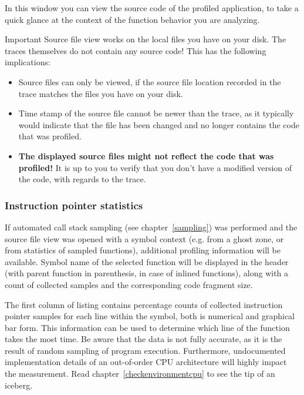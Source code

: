 \documentclass[hidelinks,titlepage,a4paper]{article}
\begin{document}
In this window you can view the source code of the profiled application, to take a quick glance at the context of the function behavior you are analyzing.

\begin{bclogo}[
noborder=true,
couleur=black!5,
logo=\bcbombe
]{Important}
Source file view works on the local files you have on your disk. The traces themselves do not contain any source code! This has the following implications:

\begin{itemize}
\item Source files can only be viewed, if the source file location recorded in the trace matches the files you have on your disk.
\item Time stamp of the source file cannot be newer than the trace, as it typically would indicate that the file has been changed and no longer contains the code that was profiled.
\item \textbf{The displayed source files might not reflect the code that was profiled!} It is up to you to verify that you don't have a modified version of the code, with regards to the trace.
\end{itemize}
\end{bclogo}

\subsubsection{Instruction pointer statistics}

If automated call stack sampling (see chapter~\ref{sampling}) was performed and the source file view was opened with a symbol context (e.g. from a ghost zone, or from statistics of sampled functions), additional profiling information will be available. Symbol name of the selected function will be displayed in the header (with parent function in parenthesis, in case of inlined functions), along with a count of collected samples and the corresponding code fragment size.

The first column of listing contains percentage counts of collected instruction pointer samples for each line within the symbol, both is numerical and graphical bar form. This information can be used to determine which line of the function takes the most time. Be aware that the data is not fully accurate, as it is the result of random sampling of program execution. Furthermore, undocumented implementation details of an out-of-order CPU architecture will highly impact the measurement. Read chapter~\ref{checkenvironmentcpu} to see the tip of an iceberg.
\end{document}
